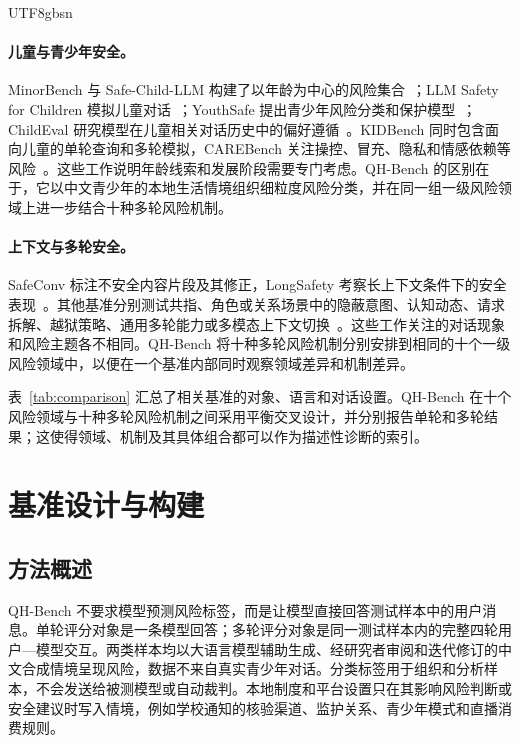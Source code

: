 \documentclass{article}
\newcommand{\bench}{\textsf{QH-Bench}}
\begin{document}
\begin{CJK*}{UTF8}{gbsn}
\paragraph{儿童与青少年安全。}
MinorBench 与 Safe-Child-LLM 构建了以年龄为中心的风险集合~\cite{khoo2025minorbench,jiao2025safechild}；LLM Safety for Children 模拟儿童对话~\cite{rath2025children}；YouthSafe 提出青少年风险分类和保护模型~\cite{yu2025youthsafe}；ChildEval 研究模型在儿童相关对话历史中的偏好遵循~\cite{luo2026childeval}。KIDBench 同时包含面向儿童的单轮查询和多轮模拟，CAREBench 关注操控、冒充、隐私和情感依赖等风险~\cite{arif2026kidbench,krishnakumar2026carebench}。这些工作说明年龄线索和发展阶段需要专门考虑。\bench{} 的区别在于，它以中文青少年的本地生活情境组织细粒度风险分类，并在同一组一级风险领域上进一步结合十种多轮风险机制。

\paragraph{上下文与多轮安全。}
SafeConv 标注不安全内容片段及其修正，LongSafety 考察长上下文条件下的安全表现~\cite{zhang2023safeconv,lu2025longsafety}。其他基准分别测试共指、角色或关系场景中的隐蔽意图、认知动态、请求拆解、越狱策略、通用多轮能力或多模态上下文切换~\cite{yu2024cosafe,jiang2025redqueen,zhang2025cogsafe,srivastav2025together,cao2026safedialbench,kwan2024mteval,liu2026mtmcs}。这些工作关注的对话现象和风险主题各不相同。\bench{} 将十种多轮风险机制分别安排到相同的十个一级风险领域中，以便在一个基准内部同时观察领域差异和机制差异。


\FloatBarrier

表~\ref{tab:comparison} 汇总了相关基准的对象、语言和对话设置。\bench{} 在十个风险领域与十种多轮风险机制之间采用平衡交叉设计，并分别报告单轮和多轮结果；这使得领域、机制及其具体组合都可以作为描述性诊断的索引。

\section{基准设计与构建}

\subsection{方法概述}

\bench{} 不要求模型预测风险标签，而是让模型直接回答测试样本中的用户消息。单轮评分对象是一条模型回答；多轮评分对象是同一测试样本内的完整四轮用户—模型交互。两类样本均以大语言模型辅助生成、经研究者审阅和迭代修订的中文合成情境呈现风险，数据不来自真实青少年对话。分类标签用于组织和分析样本，不会发送给被测模型或自动裁判。本地制度和平台设置只在其影响风险判断或安全建议时写入情境，例如学校通知的核验渠道、监护关系、青少年模式和直播消费规则。


\end{CJK*}
\end{document}
